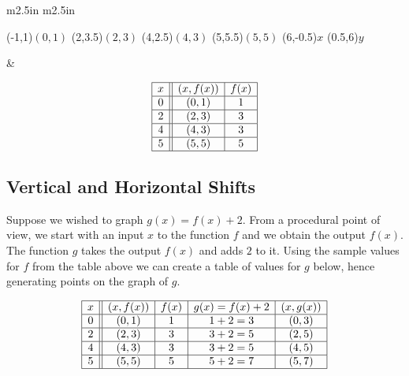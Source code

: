 \documentclass{ximera}
\begin{document}
\begin{center}

\begin{tabular}{m{2.5in} m{2.5in}}

\begin{mfpic}[15]{-1}{6}{-1}{6}
\tlabel[cc](-1,1){\scriptsize $(0,1)$}
\tlabel[cc](2,3.5){\scriptsize $(2,3)$}
\tlabel[cc](4,2.5){\scriptsize $(4,3)$}
\tlabel[cc](5,5.5){\scriptsize $(5,5)$}
\tlabel[cc](6,-0.5){\scriptsize $x$}
\tlabel[cc](0.5,6){\scriptsize $y$}
\axes
{}
\tlpointsep{4pt}
\penwd{1.25pt}
\end{mfpic}


&

\[ \begin{array}{|c||c|c|}  

\hline

 x & (x,f(x)) & f(x)  \\ \hline
0  & (0,1)& 1  \\  \hline
2 & (2,3) & 3  \\  \hline
4 & (4,3) & 3  \\  \hline
5 & (5,5) & 5 \\  \hline

\end{array} \] 



\end{tabular}

\end{center}

\subsection{Vertical and Horizontal Shifts}
\label{shifts}

Suppose we wished to graph $g(x) = f(x) + 2$.  From a procedural point of view,  we start with an input $x$ to the function $f$ and we obtain the output $f(x)$.  The function $g$ takes the output $f(x)$ and adds $2$ to it.  Using the sample values for $f$ from the table above we can create a table of values for $g$ below, hence generating points on the graph of $g$.


\[ \begin{array}{|c||c|c|c|c|}  

\hline

 x & (x,f(x)) & f(x) & g(x)=f(x)+2 & (x, g(x)) \\ \hline
0  & (0,1)& 1 & 1+2 = 3 &(0, 3) \\  \hline
2 & (2,3) & 3 & 3 + 2 =  5 &(2,5) \\  \hline
4 & (4,3) & 3 & 3 + 2 =  5 &(4, 5) \\  \hline
5 & (5,5) & 5 & 5+2 =  7 &( 5 ,7) \\  \hline

\end{array} \] 
\end{document}
